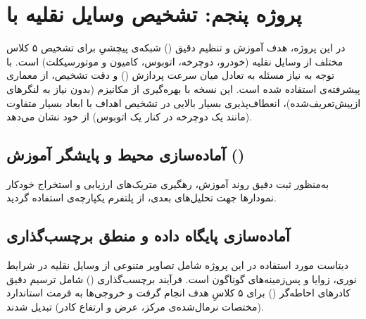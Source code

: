 \section{پروژه پنجم: تشخیص وسایل نقلیه با }
در این پروژه، هدف آموزش و تنظیم دقیق () شبکه‌ی پیچشیِ  برای تشخیص ۵ کلاس مختلف از وسایل نقلیه (خودرو، دوچرخه، اتوبوس، کامیون و موتورسیکلت) است. با توجه به نیاز مسئله به تعادل میان سرعت پردازش () و دقت تشخیص، از معماری پیشرفته‌ی  استفاده شده است. این نسخه با بهره‌گیری از مکانیزم  (بدون نیاز به لنگرهای ازپیش‌تعریف‌شده)، انعطاف‌پذیری بسیار بالایی در تشخیص اهداف با ابعاد بسیار متفاوت (مانند یک دوچرخه در کنار یک اتوبوس) از خود نشان می‌دهد.

\vspace{0.4cm}
\subsection{آماده‌سازی محیط و پایشگر آموزش ()}
به‌منظور ثبت دقیق روند آموزش، رهگیری متریک‌های ارزیابی و استخراج خودکار نمودارها جهت تحلیل‌های بعدی، از پلتفرم یکپارچه‌ی  استفاده گردید.

\begin{stepbox}
\end{stepbox}

\vspace{0.4cm}
\subsection{آماده‌سازی پایگاه داده و منطق برچسب‌گذاری}
دیتاست مورد استفاده در این پروژه شامل تصاویر متنوعی از وسایل نقلیه در شرایط نوری، زوایا و پس‌زمینه‌های گوناگون است. فرآیند برچسب‌گذاری () شامل ترسیم دقیق کادرهای احاطه‌گر () برای ۵ کلاسِ هدف انجام گرفت و خروجی‌ها به فرمت استاندارد  (مختصات نرمال‌شده‌ی مرکز، عرض و ارتفاع کادر) تبدیل شدند.

